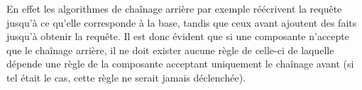 En effet les algorithmes de chaînage arrière par exemple réécrivent la requête jusqu'à ce
qu'elle corresponde à la base, tandis que ceux avant ajoutent des faits jusqu'à obtenir
la requête. Il est donc évident que si une composante n'accepte que le chaînage arrière,
il ne doit exister aucune règle de celle-ci de laquelle dépende une règle de la
composante acceptant uniquement le chaînage avant (si tel était le cas, cette règle ne
serait jamais déclenchée).


